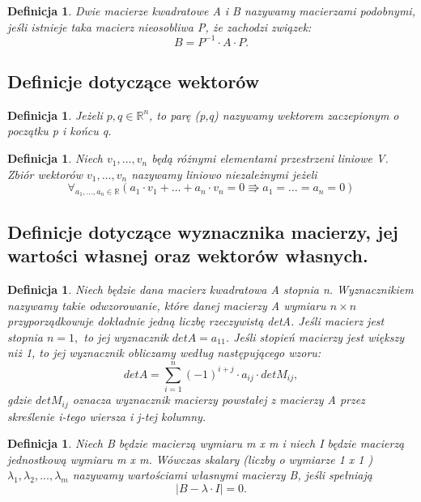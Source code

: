 \documentclass[10pt,a4paper]{report}
\newtheorem{definition}[section]{Definicja}
\begin{document}
\begin{definition}
Dwie macierze kwadratowe A i B nazywamy macierzami podobnymi, jeśli istnieje taka macierz nieosobliwa P, że zachodzi związek: 
$$ B=P^{-1}\cdot A\cdot P. $$
\end{definition}


\subsection{Definicje dotyczące wektorów} 

\begin{definition}
Jeżeli $p,q\in \mathbb{R}^{n}$, to parę (p,q) nazywamy wektorem zaczepionym o początku p i końcu q.
\end{definition}

\begin{definition}
Niech $v_{1},..., v_{n}$ będą różnymi elementami przestrzeni liniowe V. Zbiór wektorów ${v_{1},...,v_{n}}$ nazywamy liniowo niezależnymi jeżeli 
$$\forall_{a_{1},...,a_{n}\in \mathbb{R}} (a_{1}\cdot v_{1} + ... + a_{n}\cdot v_{n} = 0 \Rrightarrow a_{1}=...=a_{n}=0)
$$ 
\end{definition}

\subsection{Definicje dotyczące wyznacznika macierzy, jej wartości własnej oraz wektorów własnych.}

\begin{definition}
Niech będzie dana macierz kwadratowa A stopnia n. Wyznacznikiem nazywamy takie odwzorowanie, które danej macierzy A wymiaru $n \times n$ przyporządkowuje dokładnie jedną liczbę rzeczywistą detA. Jeśli macierz jest stopnia $n = 1, $ to jej wyznacznik $detA = a_{11}$. 
Jeśli stopień macierzy jest większy niż 1, to jej wyznacznik obliczamy według następującego wzoru: 
$$
detA = \sum_{i=1}^{n} (-1)^{i+j}\cdot a_{ij}\cdot detM_{ij},
$$
gdzie $detM_{ij}$ oznacza wyznacznik macierzy powstałej z macierzy A przez skreślenie i-tego wiersza i j-tej kolumny.
\end{definition}
\newpage
\begin{definition}
Niech B będzie macierzą wymiaru m x m i niech I będzie macierzą jednostkową wymiaru m x m. Wówczas skalary (liczby o wymiarze 1 x 1 ) $\lambda_{1}, \lambda_{2}, ..., \lambda_{m} $ nazywamy wartościami własnymi macierzy B, jeśli spełniają 
$$|B-\lambda\cdot I|=0. $$ 
\end{definition}
\end{document}
